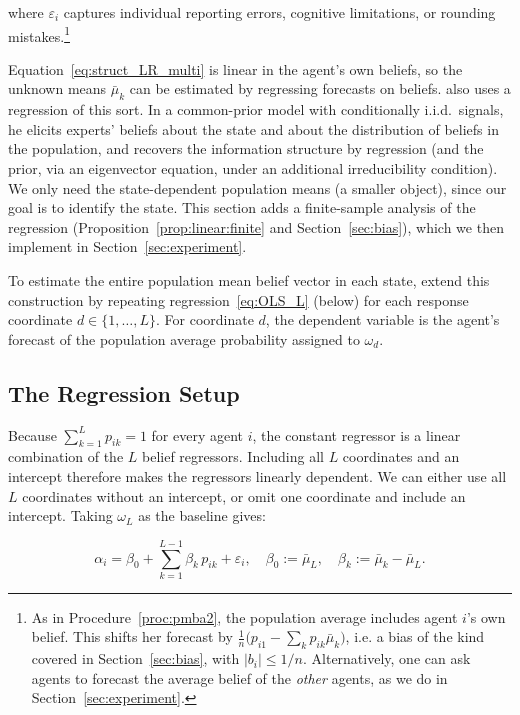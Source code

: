 \documentclass[12pt,reqno]{amsart}
\begin{document}
where $\varepsilon_i$ captures individual reporting errors, cognitive
limitations, or rounding mistakes.\footnote{As in Procedure~\ref{proc:pmba2}, the population average includes agent $i$'s own belief. This shifts her forecast by $\frac1n\bigl(p_{i1}-\sum_k p_{ik}\bar\mu_k\bigr)$, i.e. a bias of the kind covered in Section~\ref{sec:bias}, with $|b_i|\le 1/n$. Alternatively, one can ask agents to forecast the average belief of the \emph{other} agents, as we do in Section~\ref{sec:experiment}.}

Equation~\eqref{eq:struct_LR_multi} is linear in the agent's own beliefs, so the unknown means $\bar\mu_k$ can be estimated by regressing forecasts on beliefs. \cite{libgober2025wisdom} also uses a regression of this sort. In a common-prior model with conditionally i.i.d.\ signals, he elicits experts' beliefs about the state and about the distribution of beliefs in the population, and recovers the information structure by regression (and the prior, via an eigenvector equation, under an additional irreducibility condition). We only need the state-dependent population means (a smaller object), since our goal is to identify the state. This section adds a finite-sample analysis of the regression (Proposition~\ref{prop:linear:finite} and Section~\ref{sec:bias}), which we then implement in Section~\ref{sec:experiment}.

\begin{remark}

To estimate the entire population mean belief vector in each state, extend this construction by repeating regression~\eqref{eq:OLS_L} (below) for each response coordinate $d\in\{1,\ldots,L\}$. For coordinate $d$, the dependent variable is the agent's forecast of the population average probability assigned to $\omega_d$.
\end{remark}

\subsection{The Regression Setup}

Because $\sum_{k=1}^{L}p_{ik}=1$ for every agent $i$, the constant regressor is a linear combination of the $L$ belief regressors. Including all $L$ coordinates and an intercept therefore makes the regressors linearly dependent. We can either use all $L$
coordinates without an intercept, or omit one coordinate and include an
intercept. Taking $\omega_L$ as the baseline gives:

\begin{equation}
\alpha_i = \beta_0 + \sum_{k=1}^{L-1} \beta_k\,p_{ik} + \varepsilon_i, \quad
\beta_0:=\bar\mu_L,\quad \beta_k:=\bar\mu_k-\bar\mu_L.  \label{eq:OLS_L}
\end{equation}
\end{document}

